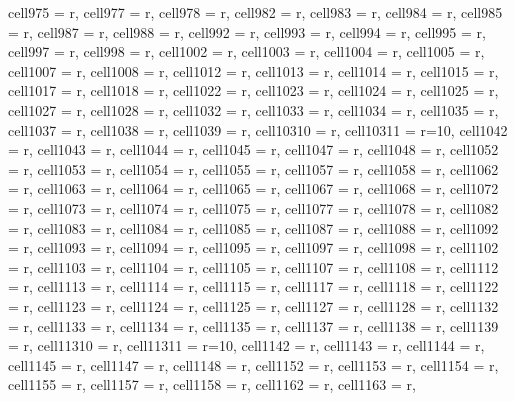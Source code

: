 \begin{longtblr}[
  caption = {Linear model estimating all the considered metrics in every alternative scenario.},
  label = {tab:appendix_LCBM_all_metrics_all_scenarios}
]
{  cell{97}{5} = {r},
  cell{97}{7} = {r},
  cell{97}{8} = {r},
  cell{98}{2} = {r},
  cell{98}{3} = {r},
  cell{98}{4} = {r},
  cell{98}{5} = {r},
  cell{98}{7} = {r},
  cell{98}{8} = {r},
  cell{99}{2} = {r},
  cell{99}{3} = {r},
  cell{99}{4} = {r},
  cell{99}{5} = {r},
  cell{99}{7} = {r},
  cell{99}{8} = {r},
  cell{100}{2} = {r},
  cell{100}{3} = {r},
  cell{100}{4} = {r},
  cell{100}{5} = {r},
  cell{100}{7} = {r},
  cell{100}{8} = {r},
  cell{101}{2} = {r},
  cell{101}{3} = {r},
  cell{101}{4} = {r},
  cell{101}{5} = {r},
  cell{101}{7} = {r},
  cell{101}{8} = {r},
  cell{102}{2} = {r},
  cell{102}{3} = {r},
  cell{102}{4} = {r},
  cell{102}{5} = {r},
  cell{102}{7} = {r},
  cell{102}{8} = {r},
  cell{103}{2} = {r},
  cell{103}{3} = {r},
  cell{103}{4} = {r},
  cell{103}{5} = {r},
  cell{103}{7} = {r},
  cell{103}{8} = {r},
  cell{103}{9} = {r},
  cell{103}{10} = {r},
  cell{103}{11} = {r=10}{},
  cell{104}{2} = {r},
  cell{104}{3} = {r},
  cell{104}{4} = {r},
  cell{104}{5} = {r},
  cell{104}{7} = {r},
  cell{104}{8} = {r},
  cell{105}{2} = {r},
  cell{105}{3} = {r},
  cell{105}{4} = {r},
  cell{105}{5} = {r},
  cell{105}{7} = {r},
  cell{105}{8} = {r},
  cell{106}{2} = {r},
  cell{106}{3} = {r},
  cell{106}{4} = {r},
  cell{106}{5} = {r},
  cell{106}{7} = {r},
  cell{106}{8} = {r},
  cell{107}{2} = {r},
  cell{107}{3} = {r},
  cell{107}{4} = {r},
  cell{107}{5} = {r},
  cell{107}{7} = {r},
  cell{107}{8} = {r},
  cell{108}{2} = {r},
  cell{108}{3} = {r},
  cell{108}{4} = {r},
  cell{108}{5} = {r},
  cell{108}{7} = {r},
  cell{108}{8} = {r},
  cell{109}{2} = {r},
  cell{109}{3} = {r},
  cell{109}{4} = {r},
  cell{109}{5} = {r},
  cell{109}{7} = {r},
  cell{109}{8} = {r},
  cell{110}{2} = {r},
  cell{110}{3} = {r},
  cell{110}{4} = {r},
  cell{110}{5} = {r},
  cell{110}{7} = {r},
  cell{110}{8} = {r},
  cell{111}{2} = {r},
  cell{111}{3} = {r},
  cell{111}{4} = {r},
  cell{111}{5} = {r},
  cell{111}{7} = {r},
  cell{111}{8} = {r},
  cell{112}{2} = {r},
  cell{112}{3} = {r},
  cell{112}{4} = {r},
  cell{112}{5} = {r},
  cell{112}{7} = {r},
  cell{112}{8} = {r},
  cell{113}{2} = {r},
  cell{113}{3} = {r},
  cell{113}{4} = {r},
  cell{113}{5} = {r},
  cell{113}{7} = {r},
  cell{113}{8} = {r},
  cell{113}{9} = {r},
  cell{113}{10} = {r},
  cell{113}{11} = {r=10}{},
  cell{114}{2} = {r},
  cell{114}{3} = {r},
  cell{114}{4} = {r},
  cell{114}{5} = {r},
  cell{114}{7} = {r},
  cell{114}{8} = {r},
  cell{115}{2} = {r},
  cell{115}{3} = {r},
  cell{115}{4} = {r},
  cell{115}{5} = {r},
  cell{115}{7} = {r},
  cell{115}{8} = {r},
  cell{116}{2} = {r},
  cell{116}{3} = {r},
}
\end{longtblr}
